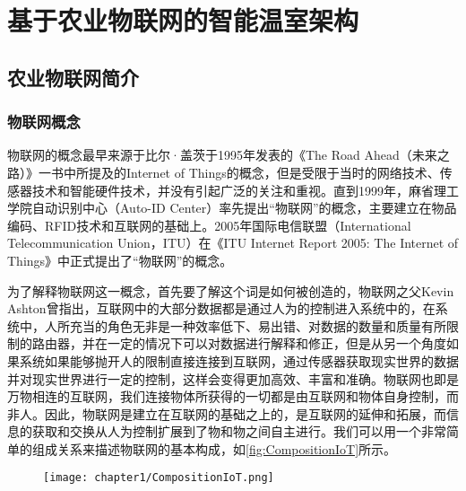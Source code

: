 
\chapter{基于农业物联网的智能温室架构}
\label{chapter:IoT Architecture}

\section{农业物联网简介}
	\subsection{物联网概念}
	物联网的概念最早来源于比尔·盖茨于1995年发表的《The Road Ahead（未来之路）》一书中所提及的Internet of Things的概念\supercite{TheRoadAhead}，但是受限于当时的网络技术、传感器技术和智能硬件技术，并没有引起广泛的关注和重视\supercite{NongYeWuLianWang}。直到1999年，麻省理工学院自动识别中心（Auto-ID Center）率先提出“物联网”的概念，主要建立在物品编码、RFID技术和互联网的基础上\supercite{ZiJiDongShouIoT}。2005年国际电信联盟（International Telecommunication Union，ITU）在《ITU Internet Report 2005: The Internet of Things》中正式提出了“物联网”的概念\supercite{2005ITU,NongYeWuLianWang}。
	
	为了解释物联网这一概念，首先要了解这个词是如何被创造的，物联网之父Kevin Ashton曾指出，互联网中的大部分数据都是通过人为的控制进入系统中的，在系统中，人所充当的角色无非是一种效率低下、易出错、对数据的数量和质量有所限制的路由器，并在一定的情况下可以对数据进行解释和修正，但是从另一个角度如果系统如果能够抛开人的限制直接连接到互联网，通过传感器获取现实世界的数据并对现实世界进行一定的控制，这样会变得更加高效、丰富和准确。物联网也即是万物相连的互联网，我们连接物体所获得的一切都是由互联网和物体自身控制，而非人\supercite{LearningIoT}。因此，物联网是建立在互联网的基础之上的，是互联网的延伸和拓展，而信息的获取和交换从人为控制扩展到了物和物之间自主进行。我们可以用一个非常简单的组成关系来描述物联网的基本构成，如\ref{fig:CompositionIoT}所示。
	\begin{figure}[!htp]
  		\centering
 		\texttt{[image: chapter1/CompositionIoT.png]}
	\end{figure}
	
